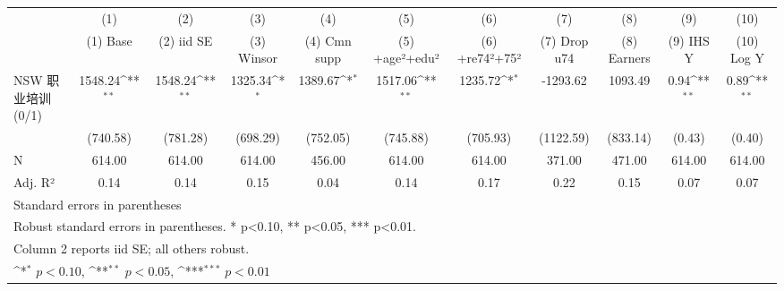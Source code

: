 {
\def\sym#1{\ifmmode^{#1}\else\(^{#1}\)\fi}
\begin{tabular}{l*{10}{c}}
\toprule
                    &\multicolumn{1}{c}{(1)}&\multicolumn{1}{c}{(2)}&\multicolumn{1}{c}{(3)}&\multicolumn{1}{c}{(4)}&\multicolumn{1}{c}{(5)}&\multicolumn{1}{c}{(6)}&\multicolumn{1}{c}{(7)}&\multicolumn{1}{c}{(8)}&\multicolumn{1}{c}{(9)}&\multicolumn{1}{c}{(10)}\\
                    &\multicolumn{1}{c}{(1) Base}&\multicolumn{1}{c}{(2) iid SE}&\multicolumn{1}{c}{(3) Winsor}&\multicolumn{1}{c}{(4) Cmn supp}&\multicolumn{1}{c}{(5) +age²+edu²}&\multicolumn{1}{c}{(6) +re74²+75²}&\multicolumn{1}{c}{(7) Drop u74}&\multicolumn{1}{c}{(8) Earners}&\multicolumn{1}{c}{(9) IHS Y}&\multicolumn{1}{c}{(10) Log Y}\\
\midrule
NSW 职业培训 (0/1)  &     1548.24\sym{**} &     1548.24\sym{**} &     1325.34\sym{*}  &     1389.67\sym{*}  &     1517.06\sym{**} &     1235.72\sym{*}  &    -1293.62         &     1093.49         &        0.94\sym{**} &        0.89\sym{**} \\
                    &    (740.58)         &    (781.28)         &    (698.29)         &    (752.05)         &    (745.88)         &    (705.93)         &   (1122.59)         &    (833.14)         &      (0.43)         &      (0.40)         \\
\midrule
N                   &      614.00         &      614.00         &      614.00         &      456.00         &      614.00         &      614.00         &      371.00         &      471.00         &      614.00         &      614.00         \\
Adj. R²             &        0.14         &        0.14         &        0.15         &        0.04         &        0.14         &        0.17         &        0.22         &        0.15         &        0.07         &        0.07         \\
\bottomrule
\multicolumn{11}{l}{\footnotesize Standard errors in parentheses}\\
\multicolumn{11}{l}{\footnotesize Robust standard errors in parentheses. * p<0.10, ** p<0.05, *** p<0.01.}\\
\multicolumn{11}{l}{\footnotesize Column 2 reports iid SE; all others robust.}\\
\multicolumn{11}{l}{\footnotesize \sym{*} \(p<0.10\), \sym{**} \(p<0.05\), \sym{***} \(p<0.01\)}\\
\end{tabular}
}
